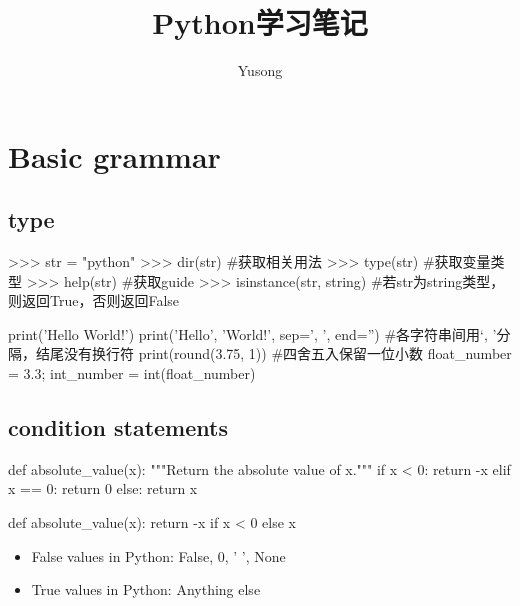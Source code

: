 \documentclass{article}
\title{\huge Python学习笔记}
\author{\large Yusong}
\date{}
\begin{document}

  \maketitle
  \thispagestyle{empty}

  \newpage
  \hypertarget{contents}{}
  \setcounter{page}{1}
  \tableofcontents

  \newpage
  \setcounter{page}{1}

  \section{Basic grammar}

    \subsection{type}
      \begin{codeblock}[language=python, caption={variable type}]
        >>> str = "python"
        >>> dir(str) #获取相关用法
        >>> type(str) #获取变量类型
        >>> help(str) #获取guide
        >>> isinstance(str, string) #若str为string类型，则返回True，否则返回False
      \end{codeblock}

      \begin{codeblock}[language=python, caption={basic functions}]
        print('Hello World!')
        print('Hello', 'World!', sep=', ', end='') #各字符串间用`, '分隔，结尾没有换行符
        print(round(3.75, 1)) #四舍五入保留一位小数
        float_number = 3.3; int_number = int(float_number)
      \end{codeblock}

    \subsection{condition statements}
      \begin{codeblock}[language=python, caption={condition statement}]
        def absolute_value(x):
          """Return the absolute value of x."""
          if x < 0:
            return -x
          elif x == 0:
            return 0
          else:
            return x

        def absolute_value(x):
          return -x if x < 0 else x
      \end{codeblock}

      \begin{itemize}
        \item False values in Python: False, 0, ' ', None
        \item True values in Python: Anything else
      \end{itemize}
\end{document}
